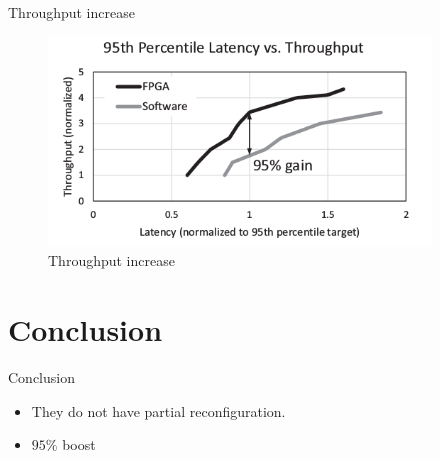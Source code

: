 \documentclass[t]{beamer}
\begin{document}
\begin{frame}{Throughput increase}
    \begin{figure}
        \includegraphics[width=4in]{img/throughput-increase.png}
        \caption{Throughput increase}
    \end{figure}
\end{frame}

\section{Conclusion}
\begin{frame}{Conclusion}
    \begin{itemize}
        \item They do not have partial reconfiguration.
        \item $95\%$ boost
    \end{itemize}
\end{frame}
\end{document}
